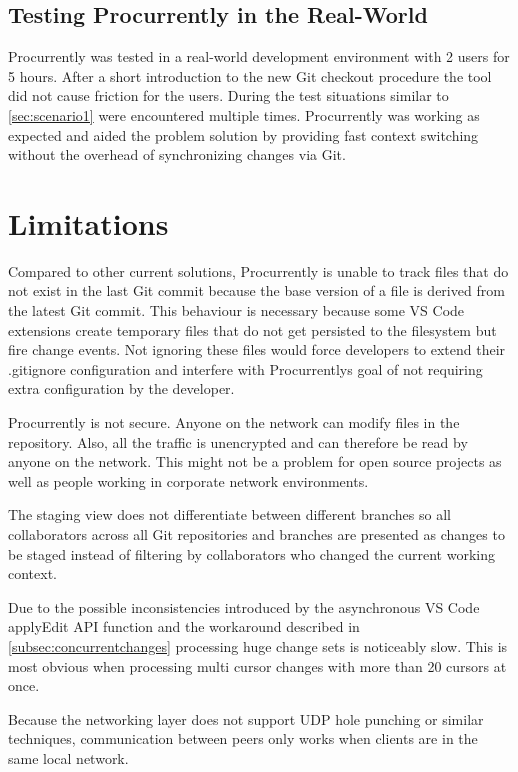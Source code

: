 \subsection{Testing Procurrently in the Real-World}

Procurrently was tested in a real-world development environment with 2 users for 5 hours. After a short introduction to the new Git checkout procedure the tool did not cause friction for the users. During the test situations similar to \autoref{sec:scenario1} were encountered multiple times. Procurrently was working as expected and aided the problem solution by providing fast context switching without the overhead of synchronizing changes via Git.

\section{Limitations}
\label{limitations}

Compared to other current solutions, Procurrently is unable to track files that do not exist in the last Git commit because the base version of a file is derived from the latest Git commit. This behaviour is necessary because some VS Code extensions create temporary files that do not get persisted to the filesystem but fire change events. Not ignoring these files would force developers to extend their .gitignore configuration and interfere with Procurrentlys goal of not requiring extra configuration by the developer.

Procurrently is not secure. Anyone on the network can modify files in the repository. Also, all the traffic is unencrypted and can therefore be read by anyone on the network. This might not be a problem for open source projects as well as people working in corporate network environments.

The staging view does not differentiate between different branches so all collaborators across all Git repositories and branches are presented as changes to be staged instead of filtering by collaborators who changed the current working context.

Due to the possible inconsistencies introduced by the asynchronous VS Code applyEdit API function and the workaround described in \autoref{subsec:concurrentchanges} processing huge change sets is noticeably slow. This is most obvious when processing multi cursor changes with more than 20 cursors at once.

Because the networking layer does not support UDP hole punching \cite{10.1007/978-3-642-20798-3_1} or similar techniques, communication between peers only works when clients are in the same local network.

